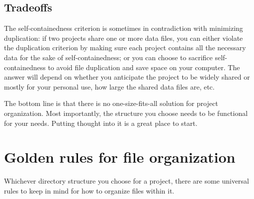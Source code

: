 \documentclass[
]{book}
\begin{document}
\hypertarget{tradeoffs}{%
\subsection{Tradeoffs}\label{tradeoffs}}

The self-containedness criterion is sometimes in contradiction with minimizing duplication: if two projects share one or more data files, you can either violate the duplication criterion by making sure each project contains all the necessary data for the sake of self-containedness; or you can choose to sacrifice self-containedness to avoid file duplication and save space on your computer. The answer will depend on whether you anticipate the project to be widely shared or mostly for your personal use, how large the shared data files are, etc.

The bottom line is that there is no one-size-fits-all solution for project organization. Most importantly, the structure you choose needs to be functional for your needs. Putting thought into it is a great place to start.

\hypertarget{golden-rules-for-file-organization}{%
\section{Golden rules for file organization}\label{golden-rules-for-file-organization}}

Whichever directory structure you choose for a project, there are some universal rules to keep in mind for how to organize files within it.
\end{document}

